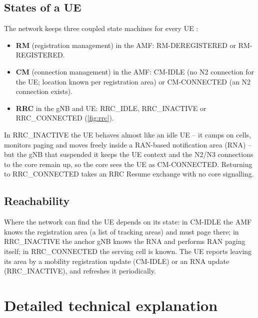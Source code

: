 \documentclass[11pt,a4paper]{article}
\begin{document}
\subsection{States of a UE}
The network keeps three coupled state machines for every UE \cite{ts23501,ts38331}:
\begin{itemize}
  \item \textbf{RM} (registration management) in the AMF: RM-DEREGISTERED or RM-REGISTERED.
  \item \textbf{CM} (connection management) in the AMF: CM-IDLE (no N2 connection for the UE; location known per registration area) or
        CM-CONNECTED (an N2 connection exists).
  \item \textbf{RRC} in the gNB and UE: RRC\_IDLE, RRC\_INACTIVE or RRC\_CONNECTED (\cref{fig:rrc}).
\end{itemize}
In RRC\_INACTIVE the UE behaves almost like an idle UE -- it camps on cells, monitors paging and moves freely inside a RAN-based notification
area (RNA) -- but the gNB that suspended it keeps the UE context and the N2/N3 connections to the core remain up, so the core sees the UE as
CM-CONNECTED. Returning to RRC\_CONNECTED takes an RRC Resume exchange with no core signalling.

\begin{acnfigure}
  \caption{NR RRC states and transitions; RRC\_INACTIVE belongs to CM-CONNECTED in the core.}
  \label{fig:rrc}
\end{acnfigure}

\subsection{Reachability}
Where the network can find the UE depends on its state: in CM-IDLE the AMF knows the registration area (a list of tracking areas) and must page
there; in RRC\_INACTIVE the anchor gNB knows the RNA and performs RAN paging itself; in RRC\_CONNECTED the serving cell is known. The UE reports
leaving its area by a mobility registration update (CM-IDLE) or an RNA update (RRC\_INACTIVE), and refreshes it periodically.

\section{Detailed technical explanation}
\end{document}
